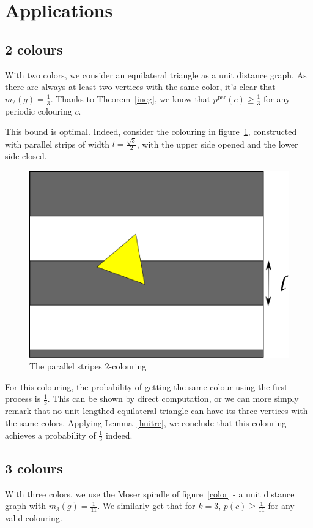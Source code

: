 \documentclass[a4paper,11pt]{article}
\theoremstyle{definition}
\theoremstyle{remark}
\newcommand{\pper}{p^{\mathrm{per}}}
\begin{document}
\section{Applications} \label{appli}
\subsection{2 colours} \label{2col}

With two colors, we consider an equilateral triangle as a unit distance graph. 
As there are always at least two vertices with the same color, it's clear that 
$m_2(g) = \frac{1}{3}$. Thanks to Theorem~\ref{ineg}, 
we know that $\pper(c) \geq \frac13$ for any periodic colouring $c$.

This bound is optimal. Indeed, consider the colouring in figure~\ref{couleur}, 
constructed with parallel strips of width 
$l = \frac {\sqrt3}{2}$, with the upper side opened and the lower side closed. 

\begin{figure}[h]
\center
\includegraphics[scale=0.5]{path6509.png}
\caption{\label{couleur} The parallel stripes $2$-colouring}
\end{figure}

For this colouring, the probability of getting the same colour using the first 
process is $\frac13$. This can be shown by direct computation, or we can 
more simply remark that no unit-lengthed equilateral triangle can have its 
three vertices with the same colors. Applying Lemma~\ref{huitre}, we conclude 
that this colouring achieves a probability of $\frac{1}{3}$ indeed.

\subsection{3 colours}
 With three colors, we use the Moser spindle of figure~\ref{color} - a unit 
 distance graph with $m_3(g) = \frac{1}{11}$.
 We similarly get that for $k=3$, $p(c) \geq \frac{1}{11}$ for any valid colouring. 
\end{document}
